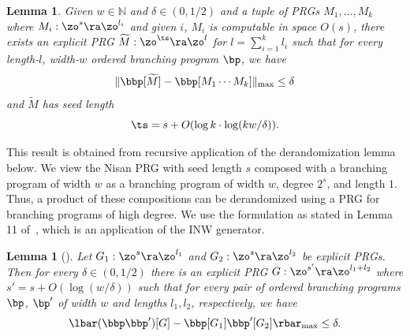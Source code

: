 \documentclass[11pt]{article}
\newtheorem{lemma}[theorem]{Lemma}
\newcommand{\N}{{\mathbb N}}
\begin{document}
\begin{lemma}
\label{lem:pathInnerTool}
Given $w\in \N$ and $\delta \in (0,1/2)$ and a tuple of PRGs $M_1,\ldots,M_{k}$ where $M_i:\zo^{s}\ra \zo^{l_i}$ and given $i$, $M_i$ is computable in space $O(s)$, there exists an explicit PRG $\widetilde{M}:\zo^{\ts}\ra\zo^l$ for $l=\sum_{i=1}^k l_i$ such that for every length-$l$, width-$w$ ordered branching program $\bp$, we have 
\[\|\bbp[\widetilde{M}]-\bbp[M_1\cdots M_k]\|_{\max}\leq \delta\] 
and $\widetilde{M}$ has seed length
\[\ts=s+O(\log k\cdot\log(kw/\delta)).\]
\end{lemma}

This result is obtained from recursive application of the derandomization lemma below. We view the Nisan PRG with seed length $s$ composed with a branching program of width $w$ as a branching program of width $w$, degree $2^s$, and length $1$. Thus, a product of these compositions can be derandomized using a PRG for branching programs of high degree. We use the formulation as stated in Lemma 11 of~\cite{ChattopadhyayLi20}, which is an application of the 
INW generator. %
\begin{lemma}[\cite{ImpagliazzoNiWi94}]
Let $G_1:\zo^s \ra \zo^{l_1}$ and $G_2:\zo^s\ra \zo^{l_2}$ be explicit PRGs. Then for every $\delta \in (0,1/2)$ there is an explicit PRG $G:\zo^{s'}\ra \zo^{l_1+l_2}$ where $s'=s+O(\log(w/\delta))$ such that for every pair of ordered branching programs $\bp$, $\bp'$ of width $w$ and lengths $l_1,l_2$, respectively, %
we have 
$$\lbar(\bbp\bbp')[G] -\bbp[G_1]\bbp'[G_2]\rbar_{\max}\leq \delta.$$
\end{lemma}
\end{document}
